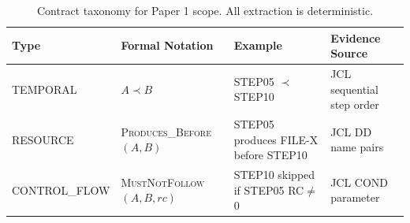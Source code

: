 \begin{table}[t]
\small
\centering
\caption{Contract taxonomy for Paper 1 scope. All extraction is deterministic.}
\label{table:taxonomy}
\begin{tabular}{llll}
\toprule
Type & Formal Notation & Example & Evidence Source \\
\midrule
TEMPORAL & $A \prec B$ & STEP05 $\prec$ STEP10 & JCL sequential step order \\
RESOURCE & \textsc{Produces\_Before}$(A, B)$ & STEP05 produces FILE-X before STEP10 & JCL DD name pairs \\
CONTROL\_FLOW & \textsc{MustNotFollow}$(A, B, rc)$ & STEP10 skipped if STEP05 RC$\neq$0 & JCL COND parameter \\
\bottomrule
\end{tabular}
\end{table}
